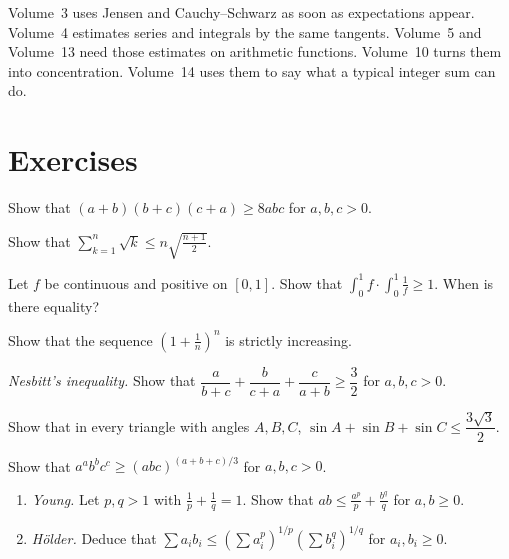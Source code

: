Volume~3 uses Jensen and Cauchy--Schwarz as soon as expectations appear. Volume~4 estimates series and integrals by the same tangents. Volume~5 and Volume~13 need those estimates on arithmetic functions. Volume~10 turns them into concentration. Volume~14 uses them to say what a typical integer sum can do.

\section{Exercises}

\begin{exercise}[$\star$]\label{ex:8abc}
Show that $(a+b)(b+c)(c+a)\ge8abc$ for $a,b,c>0$.
\end{exercise}

\begin{exercise}[$\star$]\label{ex:sqrtk}
Show that $\displaystyle\sum_{k=1}^n\sqrt k\le n\sqrt{\frac{n+1}2}$.
\end{exercise}

\begin{exercise}[$\star$]\label{ex:intcs}
Let $f$ be continuous and positive on $[0,1]$. Show that $\displaystyle\int_0^1f\cdot\int_0^1\frac1f\ge1$. When is there equality?
\end{exercise}

\begin{exercise}[$\star\star$]\label{ex:euler}
Show that the sequence $\left(1+\frac1n\right)^n$ is strictly increasing.
\end{exercise}

\begin{exercise}[$\star\star$]\label{ex:nesbitt}
\emph{Nesbitt's inequality.} Show that $\dfrac a{b+c}+\dfrac b{c+a}+\dfrac c{a+b}\ge\dfrac32$ for $a,b,c>0$.
\end{exercise}

\begin{exercise}[$\star\star$]\label{ex:triangle}
Show that in every triangle with angles $A,B,C$, $\sin A+\sin B+\sin C\le\dfrac{3\sqrt3}2$.
\end{exercise}

\begin{exercise}[$\star\star$]\label{ex:aabbcc}
Show that $a^ab^bc^c\ge(abc)^{(a+b+c)/3}$ for $a,b,c>0$.
\end{exercise}

\begin{exercise}[$\star\star$]\label{ex:holder}
\begin{enumerate}[label=(\alph*)]
\item \emph{Young.} Let $p,q>1$ with $\frac1p+\frac1q=1$. Show that $ab\le\frac{a^p}p+\frac{b^q}q$ for $a,b\ge0$.
\item \emph{H\"older.} Deduce that $\sum a_ib_i\le\left(\sum a_i^p\right)^{1/p}\left(\sum b_i^q\right)^{1/q}$ for $a_i,b_i\ge0$.
\end{enumerate}
\end{exercise}

